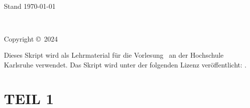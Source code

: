 \documentclass[11pt,fleqn]{book} %
\date{\today}
\begin{document}
\createTikZTitlePage{\scriptFaculty}   
{{\huge\textbf{\scriptTitle\\}}{Stand \today}}   
{\scriptAuthor}


\newpage
~\vfill
\thispagestyle{empty}

\noindent Copyright \copyright\ 2024 \scriptAuthor %


\noindent {\url{\scriptWebsite}} %

\noindent
Dieses Skript wird als Lehrmaterial für die Vorlesung \scriptCourse\ an der Hochschule Karlsruhe verwendet.
Das Skript wird unter der folgenden Lizenz veröffentlicht: \scriptLicense.

\noindent \textit{\scriptEdition} %




\pagestyle{empty} %

\tableofcontents %

\cleardoublepage %

\pagestyle{fancy} %

\part{TEIL 1}
\end{document}
